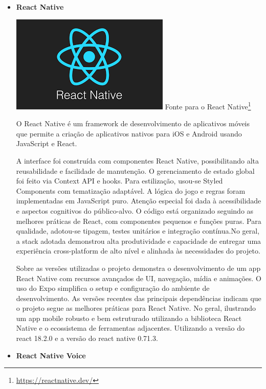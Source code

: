 \begin{itemize}

    \item \textbf{React Native} 
    \begin{center}
    \includegraphics[width=0.5\linewidth]{figuras/React Native.png}
    \label{fig:React Native}
    Fonte para o React Native\footnote{\url{https://reactnative.dev/}}
\end{center}

O React Native é um framework de desenvolvimento de aplicativos móveis que permite a criação de aplicativos nativos para iOS e Android usando JavaScript e React.

A interface foi construída com componentes React Native, possibilitando alta reusabilidade e facilidade de manutenção. O gerenciamento de estado global foi feito via Context API e hooks. Para estilização, usou-se Styled Components com tematização adaptável. A lógica do jogo e regras foram implementadas em JavaScript puro. Atenção especial foi dada à acessibilidade e aspectos cognitivos do público-alvo. O código está organizado seguindo as melhores práticas de React, com componentes pequenos e funções puras. Para qualidade, adotou-se tipagem, testes unitários e integração contínua.No geral, a stack adotada demonstrou alta produtividade e capacidade de entregar uma experiência cross-platform de alto nível e alinhada às necessidades do projeto.

Sobre as versões utilizadas o projeto demonstra o desenvolvimento de um app React Native com recursos avançados de UI, navegação, mídia e animações. O uso do Expo simplifica o setup e configuração do ambiente de desenvolvimento. As versões recentes das principais dependências indicam que o projeto segue as melhores práticas para React Native. No geral, ilustrando um app mobile robusto e bem estruturado utilizando a biblioteca React Native e o ecossistema de ferramentas adjacentes. Utilizando a versão do react 18.2.0 e a versão do react native 0.71.3. 

    \item \textbf{React Native Voice}


\end{itemize}
